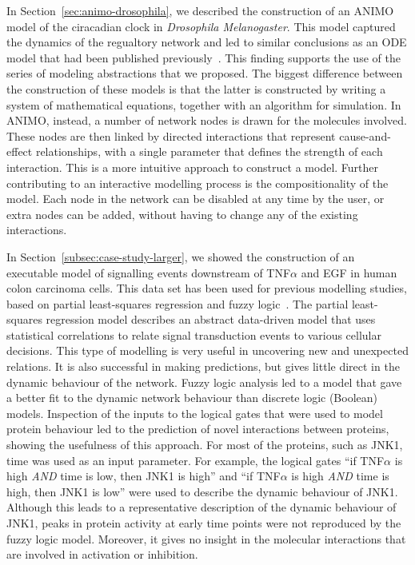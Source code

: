 In Section~\ref{sec:animo-drosophila}, we described the construction of an ANIMO
model of the ciracadian clock in \emph{Drosophila Melanogaster}. This model
captured the dynamics of the regualtory network and led to similar 
conclusions as an ODE model that had been
published previously~\citep{drosophila-ode-model}. This finding supports the use of
the series of modeling abstractions that we proposed. The biggest
difference between the construction of these models is that the latter
is constructed by writing a system of mathematical equations, together
with an algorithm for simulation. In ANIMO, instead, a number of network
nodes is drawn for the molecules involved. 
These nodes are then linked by directed
interactions that represent cause-and-effect relationships, with a single parameter 
that defines the strength of each
interaction. This is a more intuitive approach to construct a model.
Further contributing to an interactive modelling process
is the compositionality of the model. Each node in the network
can be disabled at any time by the user, or extra nodes can be added,
without having to change any of the existing interactions.

In Section~\ref{subsec:case-study-larger}, we showed the construction of an executable model
of signalling events downstream of
TNF$\alpha$ and EGF in human colon carcinoma cells. This data set has been used for
previous modelling studies, based on partial least-squares regression and fuzzy 
logic~\citep{pathway-leastsquare,pathway-fuzzy}.
The partial least-squares regression model describes an abstract data-driven model 
that uses statistical correlations
to relate signal transduction events to various cellular decisions. This type of modelling is
very useful in uncovering new and unexpected relations. It is also successful in making
predictions, but gives little direct in the dynamic behaviour of the network. Fuzzy
logic analysis led to a model that gave a better fit to the dynamic network behaviour than
discrete logic (Boolean) models. Inspection of the inputs to the logical gates that were used
to model protein behaviour led to the prediction of novel interactions between proteins,
showing the usefulness of this approach. For most of the proteins, such as JNK1, time was
used as an input parameter. For example, the logical gates ``if TNF$\alpha$ is high
\emph{AND} time is low, then JNK1 is high'' and ``if TNF$\alpha$ is high \emph{AND} time is
high, then JNK1 is low'' were used to
describe the dynamic behaviour of JNK1. Although this leads to a representative
description of the dynamic behaviour of JNK1, peaks in protein activity at early time points were
not reproduced by the fuzzy logic model. Moreover, it gives no insight in the molecular interactions 
that are involved in activation or inhibition.


